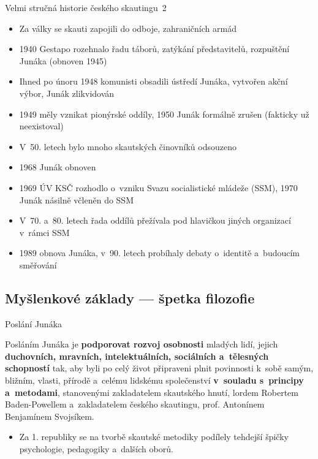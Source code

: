 \documentclass[hyperref={bookmarks=true, unicode=true, colorlinks=true, plainpages=false, pdfkeywords={Skaut, Junak, Skauting, Vychovna metoda}, linkcolor=OrangeRed, anchorcolor=OrangeRed, citecolor=RawSienna, filecolor=RawSienna, menucolor=OrangeRed, urlcolor=RawSienna, pdftex}, compress, xelatex, xcolor=dvipsnames, print]{beamer}
\begin{document}
\begin{frame}{Velmi stručná historie českého skautingu~2}
\begin{itemize}
 \item Za války se skauti zapojili do odboje, zahraničních armád
 \item 1940 Gestapo rozehnalo řadu táborů, zatýkání představitelů, rozpuštění Junáka (obnoven 1945)
 \item Ihned po únoru 1948 komunisti obsadili ústředí Junáka, vytvořen akční výbor, Junák zlikvidován
 \item 1949 měly vznikat pionýrské oddíly, 1950 Junák formálně zrušen (fakticky už neexistoval)
 \item V~50. letech bylo mnoho skautských činovníků odsouzeno
 \item 1968 Junák obnoven
 \item 1969 ÚV KSČ rozhodlo o~vzniku Svazu socialistické mládeže (SSM), 1970 Junák násilně včleněn do SSM
 \item V~70. a~80. letech řada oddílů přežívala pod hlavičkou jiných organizací v~rámci SSM
 \item 1989 obnova Junáka, v~90. letech probíhaly debaty o~identitě a~budoucím směřování
\end{itemize}
\end{frame}

\subsection{Myšlenkové základy --- špetka filozofie}

\begin{frame}{Poslání Junáka}
\begin{center}
\begin{Large}
Posláním Junáka je \textbf{podporovat rozvoj osobnosti} mladých lidí, jejich \textbf{duchovních, mravních, intelektuálních, sociálních a~tělesných schopností} tak, aby byli po celý život připraveni plnit povinnosti k~sobě samým, bližním, vlasti, přírodě a~celému lidskému společenství \textbf{v~souladu s~principy a~metodami}, stanovenými zakladatelem skautského hnutí, lordem Robertem Baden-Powellem a~zakladatelem českého skautingu, prof. Antonínem Benjamínem Svojsíkem.
\end{Large}
\end{center}
\begin{itemize}
\item Za 1. republiky se na tvorbě skautské metodiky podílely tehdejší špičky psychologie, pedagogiky a~dalších oborů.
\end{itemize}
\end{frame}
\end{document}
